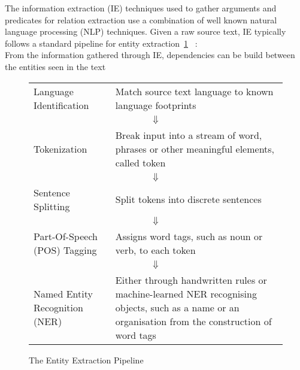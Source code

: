 \documentclass[bsc,frontabs,twoside,singlespacing,parskip,deptreport]{infthesis}     %
\begin{document}
The information extraction (IE) techniques used to gather arguments and predicates for relation extraction use a combination
of well known natural language processing (NLP) techniques. 
Given a raw source text, IE typically follows a standard pipeline for entity extraction~\ref{fig:pipeline} ~\cite{bontcheva2013twitie}:\\
From the information gathered through IE, dependencies can be build between the entities seen in the text
\begin{figure}
\begin{tcolorbox}[width=\textwidth,
                  interior hidden,
                  boxsep=10pt,
                  left=0pt,
                  right=0pt,
                  top=2pt]

 \begin{tabularx}{\linewidth}{lX}

 Language Identification &  Match source text language to known language footprints\vspace{1em}\\
  \multicolumn{2}{c}{$\Downarrow$} \\
 Tokenization &  Break input into a stream of word, phrases or other meaningful elements, called token\vspace{1em}\\

  \multicolumn{2}{c}{$\Downarrow$} \\
 Sentence Splitting &  Split tokens into discrete sentences\vspace{1em}\\

  \multicolumn{2}{c}{$\Downarrow$} \\
 Part-Of-Speech (POS) Tagging &   Assigns word tags, such as noun or verb, to each token\vspace{1em} \\

  \multicolumn{2}{c}{$\Downarrow$} \\
 Named Entity Recognition (NER) &   Either through handwritten rules or machine-learned NER recognising objects, such as a name or an
    organisation from the construction of word tags

 \end{tabularx}
\end{tcolorbox}
\caption{The Entity Extraction Pipeline}
\label{fig:pipeline}
\end{figure}
\end{document}
